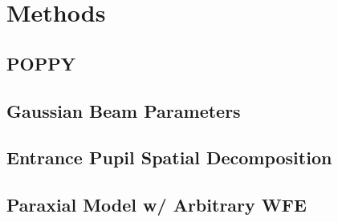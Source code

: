 \section{Methods}
\label{sect:methods}  %
\subsection{POPPY}
\subsection{Gaussian Beam Parameters}
\subsection{Entrance Pupil Spatial Decomposition}
\subsection{Paraxial Model w/ Arbitrary WFE}